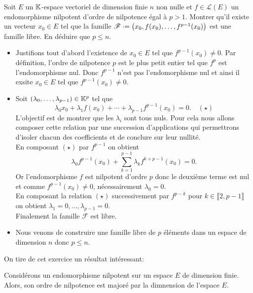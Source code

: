 \begin{exercice}
    Soit $E$ un $\mathbb{K}$-espace vectoriel de dimension finie $n$ non nulle et $f \in \mathscr{L}(E)$ un endomorphisme nilpotent d'ordre de nilpotence égal à $p > 1$. Montrer qu'il existe un vecteur $x_0 \in E$ tel que la famille $\mathscr{F} \defeq \big(x_0, f(x_0), \dots, f^{p-1}(x_0) \big)$ est une famille libre. En déduire que $p \leqslant n$. 
\end{exercice}    

\begin{solution}
    \begin{itemize}
        \item Justifions tout d'abord l'existence de $x_0 \in E$ tel que $f^{p-1}(x_0) \not= 0$. Par définition, l'ordre de nilpotence $p$ est le plus petit entier tel que $f^p$ est l'endomorphisme nul. Donc $f^{p-1}$ n'est pas l'endomorphisme nul et ainsi il exsite $x_0 \in E$ tel que $f^{p-1}(x_0) \not= 0$.
        \item Soit $(\lambda_0, \dots, \lambda_{p-1}) \in \mathbb{K}^p$ tel que 
        $$\lambda_0 x_0 + \lambda_1 f(x_0) + \cdots + \lambda_{p-1} f^{p-1}(x_0) = 0. \quad (\star)$$
        L'objectif est de montrer que les $\lambda_i$ sont tous nuls. Pour cela nous allons composer cette relation par une succession d'applications qui permettrons d'isoler chacun des coefficients et de conclure sur leur nullité. \\
        En composant $(\star)$ par $f^{p-1}$ on obtient
        $$\lambda_0 f^{p-1}(x_0) + \sum_{k=1}^{p-1} \lambda_k f^{k + p-1}(x_0) = 0.$$
        Or l'endomorphisme $f$ est nilpotent d'ordre $p$ donc le deuxième terme est nul et comme $f^{p-1}(x_0) \not= 0$, nécessairement $\lambda_0 = 0$. \\
        En composant la relation $(\star)$ successivement par $f^{p - k}$ pour $k \in \llbracket 2, p-1 \rrbracket$ on obtient $\lambda_1 = 0, \dots, \lambda_{p-1} = 0$. \\
        Finalement la famille $\mathscr{F}$ est libre.
        \item Nous venons de construire une famille libre de $p$ éléments dans un espace de dimension $n$ donc $p \leqslant n$. 
    \end{itemize}
\end{solution}
On tire de cet exercice un résultat intéressant:
\begin{prop}{}
    Considérons un endomorphisme nilpotent sur un espace $E$ de dimension finie. Alors, son ordre de nilpotence est majoré par la dimnension de l'espace $E$.
\end{prop}

